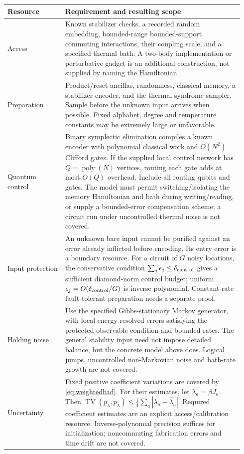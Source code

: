 \documentclass[11pt,a4paper]{article}
\newcommand{\TV}{\operatorname{TV}}
\newcommand{\poly}{\operatorname{poly}}
\begin{document}
\begingroup\small
\begin{longtable}{@{}P{0.23\linewidth}P{0.71\linewidth}@{}}
\toprule
Resource & Requirement and resulting scope\\\midrule\endhead
Access & Known stabilizer checks, a recorded random embedding, bounded-range bounded-support commuting interactions, their coupling scale, and a specified thermal bath. A two-body implementation or perturbative gadget is an additional construction, not supplied by naming the Hamiltonian.\\[5pt]
Preparation & Product/reset ancillas, randomness, classical memory, a stabilizer encoder, and the thermal syndrome sampler. Sample before the unknown input arrives when possible. Fixed alphabet, degree and temperature constants may be extremely large or unfavorable.\\[5pt]
Quantum control & Binary symplectic elimination compiles a known encoder with polynomial classical work and $O(N^2)$ Clifford gates. If the supplied local control network has $Q=\poly(N)$ vertices, routing each gate adds at most $O(Q)$ overhead. Include all routing qubits and gates. The model must permit switching/isolating the memory Hamiltonian and bath during writing/reading, or supply a bounded-error compensation scheme; a circuit run under uncontrolled thermal noise is not covered.\\[5pt]
Input protection & An unknown bare input cannot be purified against an error already inflicted before encoding. Its entry error is a boundary resource. For a circuit of $G$ noisy locations, the conservative condition $\sum_j\epsilon_j\leq\delta_{\rm control}$ gives a sufficient diamond-norm control budget; uniform $\epsilon_j=O(\delta_{\rm control}/G)$ is inverse polynomial. Constant-rate fault-tolerant preparation needs a separate proof.\\[5pt]
Holding noise & Use the specified Gibbs-stationary Markov generator, with local energy-resolved errors satisfying the protected-observable condition and bounded rates. The general stability input need not impose detailed balance, but the concrete model above does. Logical jumps, uncontrolled non-Markovian noise and bath-rate growth are not covered.\\[5pt]
Uncertainty & Fixed positive coefficient variations are covered by \eqref{eq:weightedbad}. For their estimates, let $\lambda_a=\beta J_a$. Then $\TV(p_\lambda,p_{\widehat\lambda})\leq\frac14\sum_a|\lambda_a-\widehat\lambda_a|$. Required coefficient estimates are an explicit access/calibration resource. Inverse-polynomial precision suffices for initialization; noncommuting fabrication errors and time drift are not covered.\\[5pt]

\end{longtable}
\end{document}
